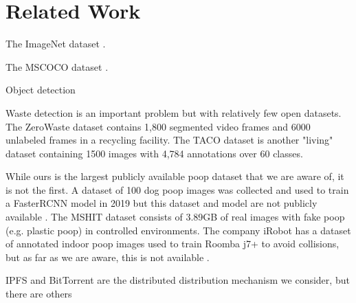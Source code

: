 \documentclass[10pt,twocolumn,letterpaper]{article}
\begin{document}
\section{Related Work}


The ImageNet dataset \cite{ILSVRC15}.

The MSCOCO dataset \cite{lin_microsoft_2014}.

Object detection

Waste detection is an important problem but with relatively few open datasets.
The ZeroWaste dataset \cite{bashkirova_zerowaste_2022} contains 1,800 segmented
video frames and 6000 unlabeled frames in a recycling facility.
The TACO dataset \cite{proenca_taco_2020} is another "living" dataset
containing 1500 images with 4,784 annotations over 60 classes.






While ours is the largest publicly available poop dataset that we are aware of,
it is not the first.
A dataset of 100 dog poop images was collected and used to train a FasterRCNN
model in 2019 but this dataset and model are not publicly available \cite{neeraj_madan_dog_2019}.
The MSHIT dataset \cite{mshit_2020} consists of 3.89GB of real images with fake
poop (e.g. plastic poop) in controlled environments.
The company iRobot has a dataset of annotated indoor poop images used to train
Roomba j7+ to avoid collisions, but as far as we are aware, this is not
available \cite{roomba_2021}.


IPFS and BitTorrent are the distributed distribution mechanism we consider, but there are others

\end{document}
